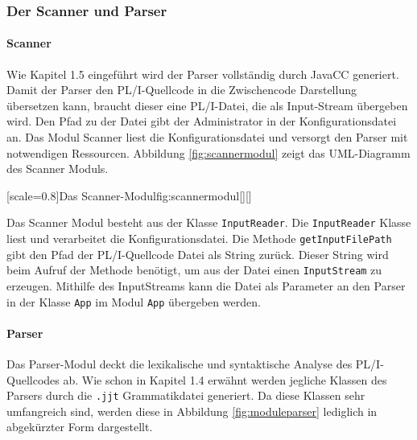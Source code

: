 \subsubsection{Der Scanner und Parser}
\paragraph{Scanner}
Wie Kapitel 1.5 eingeführt wird der Parser vollständig durch 
JavaCC generiert.
Damit der Parser den PL/I-Quellcode in die Zwischencode Darstellung übersetzen kann,
braucht dieser eine PL/I-Datei, die als Input-Stream übergeben wird.
Den Pfad zu der Datei gibt der Administrator in der Konfigurationsdatei an.
Das Modul Scanner liest die Konfigurationsdatei und versorgt den Parser mit notwendigen Ressourcen.
Abbildung \ref{fig:scannermodul} zeigt das UML-Diagramm des Scanner Moduls.

[scale=0.8]{Das Scanner-Modul}{fig:scannermodul}[][]

Das Scanner Modul besteht aus der Klasse \verb+InputReader+. 
Die \verb+InputReader+ Klasse liest und verarbeitet die Konfigurationsdatei. Die Methode \verb+getInputFilePath+ gibt den Pfad der PL/I-Quellcode Datei als String zurück.
Dieser String wird beim Aufruf der  Methode benötigt, um aus der Datei einen \verb+InputStream+ zu erzeugen.
Mithilfe des InputStreams kann die Datei als Parameter an den Parser in der Klasse \verb+App+ im Modul \verb+App+
übergeben werden. 


\paragraph{Parser}
Das Parser-Modul deckt die lexikalische und syntaktische Analyse des PL/I-Quellcodes ab.
Wie schon in Kapitel 1.4 erwähnt werden jegliche Klassen des Parsers durch die \verb+.jjt+ Grammatikdatei generiert. Da diese Klassen sehr umfangreich sind, werden diese in Abbildung \ref{fig:moduleparser} lediglich in abgekürzter Form dargestellt. 

